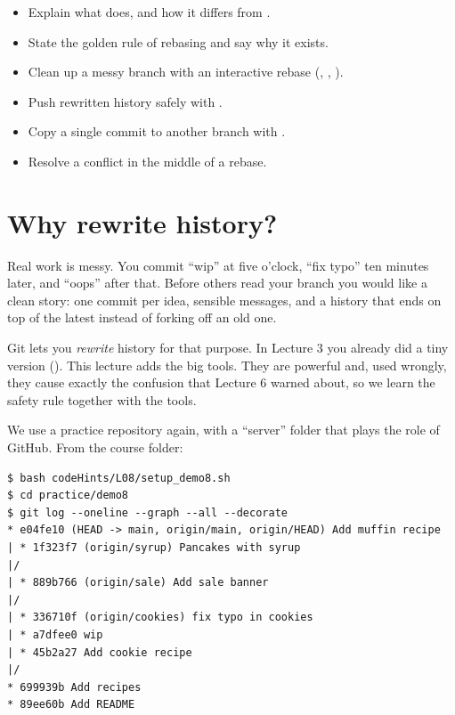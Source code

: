 


\begin{goals}
\begin{itemize}
  \item Explain what  does, and how it differs from .
  \item State the golden rule of rebasing and say why it exists.
  \item Clean up a messy branch with an interactive rebase (, , ).
  \item Push rewritten history safely with .
  \item Copy a single commit to another branch with .
  \item Resolve a conflict in the middle of a rebase.
\end{itemize}
\end{goals}

\section{Why rewrite history?}

Real work is messy. You commit ``wip'' at five o'clock, ``fix typo'' ten minutes later, and ``oops'' after that. Before others read your branch you would like a clean story: one commit per idea, sensible messages, and a history that ends on top of the latest  instead of forking off an old one.

Git lets you \emph{rewrite} history for that purpose. In Lecture 3 you already did a tiny version (). This lecture adds the big tools. They are powerful and, used wrongly, they cause exactly the confusion that Lecture 6 warned about, so we learn the safety rule together with the tools.

We use a practice repository again, with a ``server'' folder that plays the role of GitHub. From the course folder:

\begin{lstlisting}
$ bash codeHints/L08/setup_demo8.sh
$ cd practice/demo8
$ git log --oneline --graph --all --decorate
* e04fe10 (HEAD -> main, origin/main, origin/HEAD) Add muffin recipe
| * 1f323f7 (origin/syrup) Pancakes with syrup
|/
| * 889b766 (origin/sale) Add sale banner
|/
| * 336710f (origin/cookies) fix typo in cookies
| * a7dfee0 wip
| * 45b2a27 Add cookie recipe
|/
* 699939b Add recipes
* 89ee60b Add README
\end{lstlisting}

